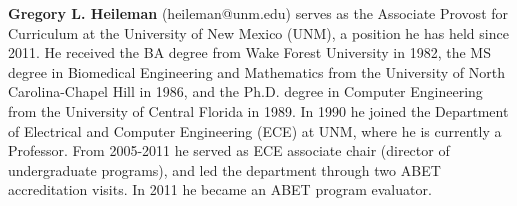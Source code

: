 \documentclass[12pt,letterpaper]{article}
\begin{document}
{\bf Gregory L. Heileman} (heileman@unm.edu) serves as the Associate Provost for Curriculum at the University of New Mexico (UNM), a position he has held since 2011.  He received the BA degree from Wake Forest University in 1982, the MS degree in Biomedical Engineering and Mathematics from the University of North Carolina-Chapel Hill in 1986, and the Ph.D. degree in Computer Engineering from the University of Central Florida in 1989.  In 1990 he joined the Department of Electrical and Computer Engineering (ECE) at UNM, where he is currently a Professor. From 2005-2011 he served as ECE associate chair (director of undergraduate programs), and led the department through two ABET accreditation visits.  In 2011 he became an ABET program evaluator. 
\end{document}
